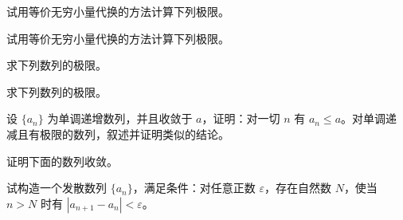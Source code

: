\noindent\begin{minipage}{\textwidth}
试用等价无穷小量代换的方法计算下列极限。
\end{minipage}\par\vfill
\newpage
\noindent\begin{minipage}{\textwidth}
试用等价无穷小量代换的方法计算下列极限。
\end{minipage}\par\vfill
\noindent\begin{minipage}{\textwidth}
求下列数列的极限。
\end{minipage}\par\vfill
\noindent\begin{minipage}{\textwidth}
求下列数列的极限。
\end{minipage}\par\vfill
\noindent\begin{minipage}{\textwidth}
设 $\{a_n\}$ 为单调递增数列，并且收敛于 $a$，证明：对一切 $n$ 有 $a_n\le a$。对单调递减且有极限的数列，叙述并证明类似的结论。
\end{minipage}\par\vfill
\newpage
\noindent\begin{minipage}{\textwidth}
证明下面的数列收敛。
\end{minipage}\par\vfill
\noindent\begin{minipage}{\textwidth}
试构造一个发散数列 $\{a_n\}$，满足条件：对任意正数 $\varepsilon$，存在自然数 $N$，使当 $n>N$ 时有 $|a_{n+1}-a_n|<\varepsilon$。
\end{minipage}\par\vfill
